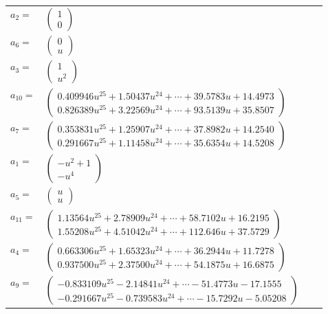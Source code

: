 \documentclass[1p]{elsarticle_modified}
\theoremstyle{definition}
\begin{document}
\begin{tabular}{m{7pt} m{180pt} m{7pt} m{180pt} }
\flushright $a_{2}=$&$\begin{pmatrix}1\\0\end{pmatrix}$ \\
\flushright $a_{6}=$&$\begin{pmatrix}0\\u\end{pmatrix}$ \\
\flushright $a_{3}=$&$\begin{pmatrix}1\\u^2\end{pmatrix}$ \\
\flushright $a_{10}=$&$\begin{pmatrix}0.409946 u^{25}+1.50437 u^{24}+\cdots+39.5783 u+14.4973\\0.826389 u^{25}+3.22569 u^{24}+\cdots+93.5139 u+35.8507\end{pmatrix}$ \\
\flushright $a_{7}=$&$\begin{pmatrix}0.353831 u^{25}+1.25907 u^{24}+\cdots+37.8982 u+14.2540\\0.291667 u^{25}+1.11458 u^{24}+\cdots+35.6354 u+14.5208\end{pmatrix}$ \\
\flushright $a_{1}=$&$\begin{pmatrix}- u^2+1\\- u^4\end{pmatrix}$ \\
\flushright $a_{5}=$&$\begin{pmatrix}u\\u\end{pmatrix}$ \\
\flushright $a_{11}=$&$\begin{pmatrix}1.13564 u^{25}+2.78909 u^{24}+\cdots+58.7102 u+16.2195\\1.55208 u^{25}+4.51042 u^{24}+\cdots+112.646 u+37.5729\end{pmatrix}$ \\
\flushright $a_{4}=$&$\begin{pmatrix}0.663306 u^{25}+1.65323 u^{24}+\cdots+36.2944 u+11.7278\\0.937500 u^{25}+2.37500 u^{24}+\cdots+54.1875 u+16.6875\end{pmatrix}$ \\
\flushright $a_{9}=$&$\begin{pmatrix}-0.833109 u^{25}-2.14841 u^{24}+\cdots-51.4773 u-17.1555\\-0.291667 u^{25}-0.739583 u^{24}+\cdots-15.7292 u-5.05208\end{pmatrix}$ \\

\end{tabular}
\end{document}
